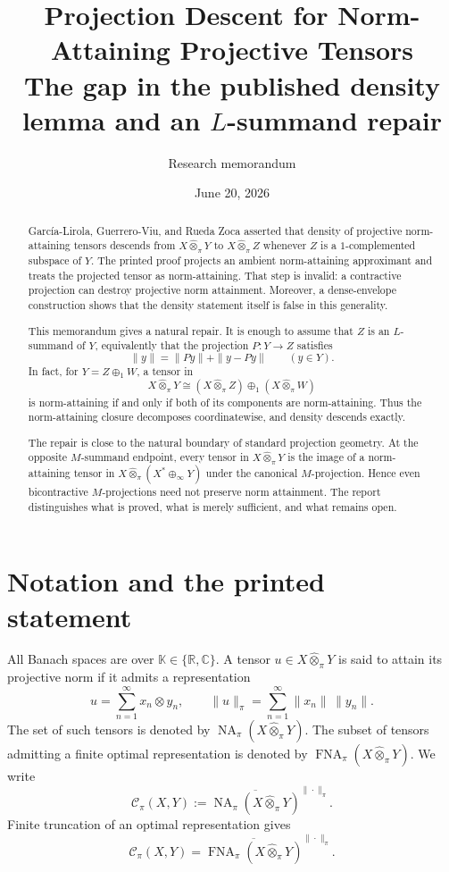 \documentclass[11pt]{article}
\title{Projection Descent for Norm-Attaining Projective Tensors\\
\large The gap in the published density lemma and an $L$-summand repair}
\author{Research memorandum}
\date{June 20, 2026}
\theoremstyle{definition}
\theoremstyle{remark}
\newcommand{\K}{\mathbb K}
\newcommand{\whot}{\widehat\otimes_\pi}
\newcommand{\NA}{\operatorname{NA}_\pi}
\newcommand{\FNA}{\operatorname{FNA}_\pi}
\newcommand{\Cpi}{\mathscr C_\pi}
\newcommand{\cl}{\overline}
\begin{document}
\maketitle

\begin{abstract}
Garc\'ia-Lirola, Guerrero-Viu, and Rueda Zoca asserted that density of projective norm-attaining tensors descends from $X\whot Y$ to $X\whot Z$ whenever $Z$ is a $1$-complemented subspace of $Y$.  The printed proof projects an ambient norm-attaining approximant and treats the projected tensor as norm-attaining.  That step is invalid: a contractive projection can destroy projective norm attainment.  Moreover, a dense-envelope construction shows that the density statement itself is false in this generality.

This memorandum gives a natural repair.  It is enough to assume that $Z$ is an $L$-summand of $Y$, equivalently that the projection $P:Y\to Z$ satisfies
\[
 \|y\|=\|Py\|+\|y-Py\|\qquad(y\in Y).
\]
In fact, for $Y=Z\oplus_1 W$, a tensor in
\[
 X\whot Y\cong (X\whot Z)\oplus_1(X\whot W)
\]
is norm-attaining if and only if both of its components are norm-attaining.  Thus the norm-attaining closure decomposes coordinatewise, and density descends exactly.

The repair is close to the natural boundary of standard projection geometry.  At the opposite $M$-summand endpoint, every tensor in $X\whot Y$ is the image of a norm-attaining tensor in $X\whot(X^*\oplus_\infty Y)$ under the canonical $M$-projection.  Hence even bicontractive $M$-projections need not preserve norm attainment.  The report distinguishes what is proved, what is merely sufficient, and what remains open.
\end{abstract}

\tableofcontents

\section{Notation and the printed statement}

All Banach spaces are over $\K\in\{\mathbb R,\mathbb C\}$.  A tensor $u\in X\whot Y$ is said to attain its projective norm if it admits a representation
\[
 u=\sum_{n=1}^\infty x_n\otimes y_n,
 \qquad
 \|u\|_\pi=\sum_{n=1}^\infty\|x_n\|\,\|y_n\|.
\]
The set of such tensors is denoted by $\NA(X\whot Y)$.  The subset of tensors admitting a finite optimal representation is denoted by $\FNA(X\whot Y)$.  We write
\[
 \Cpi(X,Y):=\cl{\NA(X\whot Y)}^{\|\cdot\|_\pi}.
\]
Finite truncation of an optimal representation gives
\begin{equation}\label{eq:closure-fna}
 \Cpi(X,Y)=\cl{\FNA(X\whot Y)}^{\|\cdot\|_\pi}.
\end{equation}
\end{document}
